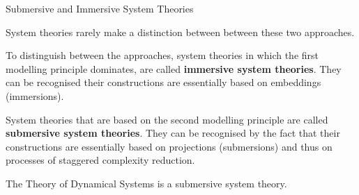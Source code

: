 \documentclass{beamer}
\begin{document}
\begin{frame}{Submersive and Immersive System Theories}
  
System theories rarely make a distinction between between these two
approaches.

To distinguish between the approaches, system theories in which the first
modelling principle dominates, are called \textbf{immersive system
  theories}. They can be recognised their constructions are essentially based
on embeddings (immersions).  

System theories that are based on the second modelling principle are called
\textbf{submersive system theories}.  They can be recognised by the fact that
their constructions are essentially based on projections (submersions) and
thus on processes of staggered complexity reduction.

The Theory of Dynamical Systems is a submersive system theory.
\end{frame}
\end{document}
